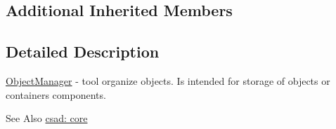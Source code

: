 \subsection*{Additional Inherited Members}


\subsection{Detailed Description}
\hyperlink{classcsad_1_1_object_manager}{Object\-Manager} -\/ tool organize objects. Is intended for storage of objects or containers components. 

\begin{DoxySeeAlso}{See Also}
\hyperlink{group__core}{csad\-: core} 
\end{DoxySeeAlso}
